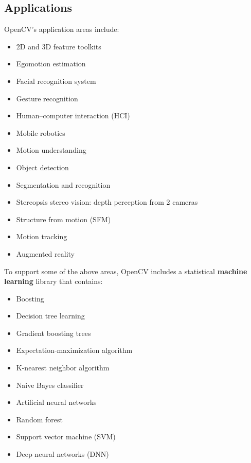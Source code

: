     \subsection{Applications}
        OpenCV's application areas include:
        \begin{itemize}
            \item 2D and 3D feature toolkits
            \item Egomotion estimation
            \item Facial recognition system
            \item Gesture recognition
            \item Human–computer interaction (HCI)
            \item Mobile robotics
            \item Motion understanding
            \item Object detection
            \item Segmentation and recognition
            \item Stereopsis stereo vision: depth perception from 2 cameras
            \item Structure from motion (SFM)
            \item Motion tracking
            \item Augmented reality
        \end{itemize}
        To support some of the above areas, OpenCV includes a statistical \textbf{machine learning} library that contains:
        \begin{itemize}
            \item Boosting
            \item Decision tree learning
            \item Gradient boosting trees
            \item Expectation-maximization algorithm
            \item K-nearest neighbor algorithm
            \item Naive Bayes classifier
            \item Artificial neural networks
            \item Random forest
            \item Support vector machine (SVM)
            \item Deep neural networks (DNN)
        \end{itemize}
